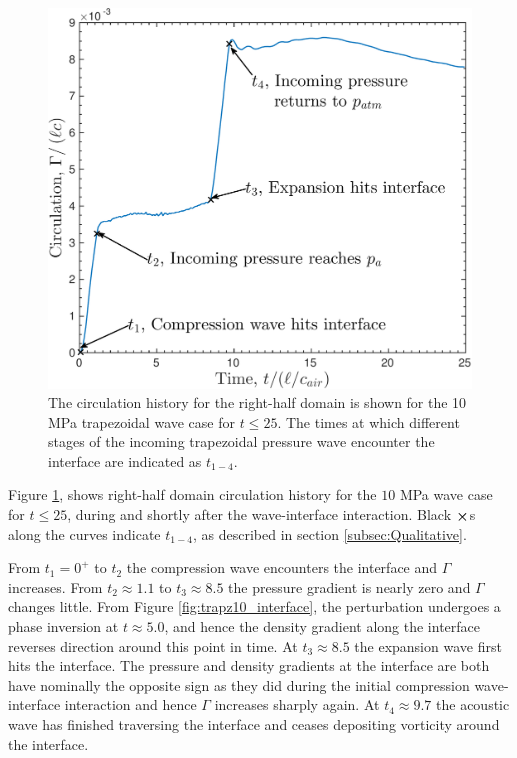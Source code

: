 \begin{figure}[h] 
  \centering
  \includegraphics[height=0.3\textheight]{./figs/lung_figs/trapz10_circ_schematic}
  \caption[Circulation deposition by the 10 MPa trapezoidal wave] {The
    circulation history for the right-half domain is shown for the 10
    MPa trapezoidal wave case for $t\leq25$. The times at which
    different stages of the incoming trapezoidal pressure wave
    encounter the interface are indicated as $t_{1-4}$.}
  \label{fig:trapz10_circ_schematic}
\end{figure}

Figure \ref{fig:trapz10_circ_schematic}, shows right-half domain
circulation history for the $10$ MPa wave case for $t\leq25$, during
and shortly after the wave-interface interaction. Black $\boldsymbol{\times}$s
along the curves indicate $t_{1-4}$, as described in
section \ref{subsec:Qualitative}.

From $t_1=0^+$ to $t_2$ the compression wave encounters the interface
and $\Gamma$ increases. From $t_2\approx1.1$ to $t_3\approx8.5$ the
pressure gradient is nearly zero and $\Gamma$ changes little. From
Figure \ref{fig:trapz10_interface}, the perturbation undergoes a phase
inversion at $t\approx 5.0$, and hence the density gradient along the
interface reverses direction around this point in time. At
$t_3\approx8.5$ the expansion wave first hits the interface. The
pressure and density gradients at the interface are both have
nominally the opposite sign as they did during the initial compression
wave-interface interaction and hence $\Gamma$ increases sharply
again. At $t_4\approx9.7$ the acoustic wave has finished traversing
the interface and ceases depositing vorticity around the interface.

